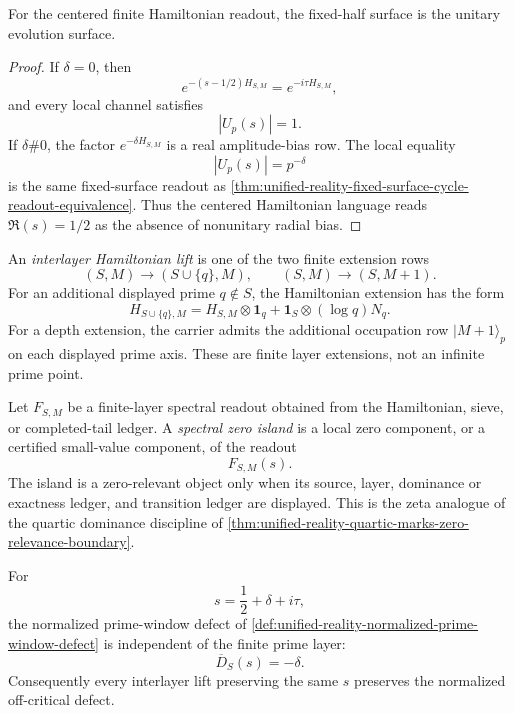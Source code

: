 \begin{theorem}
\label{thm:unified-reality-critical-line-unitary-hamiltonian-surface}
For the centered finite Hamiltonian readout, the fixed-half surface is
the unitary evolution surface.
\end{theorem}

\begin{proof}
If $\delta=0$, then
$$
e^{-(s-1/2)H_{S,M}}=e^{-i\tau H_{S,M}},
$$
and every local channel satisfies
$$
|U_p(s)|=1.
$$
If $\delta\#0$, the factor $e^{-\delta H_{S,M}}$ is a real
amplitude-bias row.  The local equality
$$
|U_p(s)|=p^{-\delta}
$$
is the same fixed-surface readout as
\autoref{thm:unified-reality-fixed-surface-cycle-readout-equivalence}.
Thus the centered Hamiltonian language reads $\Re(s)=1/2$ as the
absence of nonunitary radial bias.
\end{proof}

\begin{definition}
\label{def:unified-reality-interlayer-hamiltonian-lift}
An \emph{interlayer Hamiltonian lift} is one of the two finite extension
rows
$$
(S,M)\to(S\cup\{q\},M),
\qquad
(S,M)\to(S,M+1).
$$
For an additional displayed prime $q\notin S$, the Hamiltonian extension
has the form
$$
H_{S\cup\{q\},M}
=
H_{S,M}\otimes\mathbf 1_q
+
\mathbf 1_S\otimes(\log q)N_q.
$$
For a depth extension, the carrier admits the additional occupation row
$|M+1\rangle_p$ on each displayed prime axis.  These are finite layer
extensions, not an infinite prime point.
\end{definition}

\begin{definition}
\label{def:unified-reality-spectral-zero-island-finite-layer}
Let $F_{S,M}$ be a finite-layer spectral readout obtained from the
Hamiltonian, sieve, or completed-tail ledger.  A \emph{spectral zero
island} is a local zero component, or a certified small-value component,
of the readout
$$
F_{S,M}(s).
$$
The island is a zero-relevant object only when its source, layer,
dominance or exactness ledger, and transition ledger are displayed.
This is the zeta analogue of the quartic dominance discipline of
\autoref{thm:unified-reality-quartic-marks-zero-relevance-boundary}.
\end{definition}

\begin{theorem}
\label{thm:unified-reality-normalized-defect-invariant-prime-layer-lifts}
For
$$
s=\frac12+\delta+i\tau,
$$
the normalized prime-window defect of
\autoref{def:unified-reality-normalized-prime-window-defect} is
independent of the finite prime layer:
$$
\overline D_S(s)=-\delta.
$$
Consequently every interlayer lift preserving the same $s$ preserves
the normalized off-critical defect.
\end{theorem}

